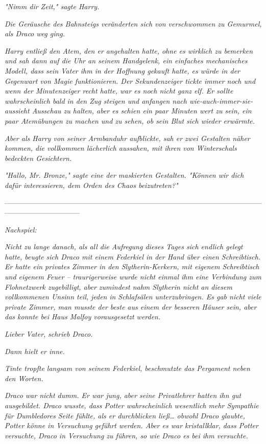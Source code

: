 {\emph{"Nimm dir Zeit," sagte Harry.}

\emph{Die Geräusche des Bahnsteigs veränderten sich von verschwommen zu Gemurmel, als Draco weg ging.}

\emph{Harry entließ den Atem, den er angehalten hatte, ohne es wirklich zu bemerken und sah dann auf die Uhr an seinem Handgelenk, ein einfaches mechanisches Modell, dass sein Vater ihm in der Hoffnung gekauft hatte, es würde in der Gegenwart von Magie funktionieren. Der Sekundenzeiger tickte immer noch und wenn der Minutenzeiger recht hatte, war es noch nicht ganz elf. Er sollte wahrscheinlich bald in den Zug steigen und anfangen nach wie-auch-immer-sie-aussieht Ausschau zu halten, aber es schien ein paar Minuten wert zu sein, ein paar Atemübungen zu machen und zu sehen, ob sein Blut sich wieder erwärmte.}

\emph{Aber als Harry von seiner Armbanduhr aufblickte, sah er zwei Gestalten näher kommen, die vollkommen lächerlich aussahen, mit ihren von Winterschals bedeckten Gesichtern.}

\emph{"Hallo, Mr. Bronze," sagte eine der maskierten Gestalten. "Können wir dich dafür interessieren, dem Orden des Chaos beizutreten?"}

--------------------------------------------------------------------------------------------------------------------------------------------

\emph{Nachspiel:}

\emph{Nicht zu lange danach, als all die Aufregung dieses Tages sich endlich gelegt hatte, beugte sich Draco mit einem Federkiel in der Hand über einen Schreibtisch. Er hatte ein privates Zimmer in den Slytherin-Kerkern, mit eigenem Schreibtisch und eigenem Feuer -- traurigerweise wurde nicht einmal ihm eine Verbindung zum Flohnetzwerk zugebilligt, aber zumindest nahm Slytherin nicht an diesem vollkommenen Unsinn teil,} \emph{\emph{jeden}} \emph{in Schlafsälen unterzubringen. Es gab nicht viele private Zimmer, man musste der} \emph{\emph{beste}} \emph{aus einem der besseren Häuser sein, aber das konnte bei Haus Malfoy vorausgesetzt werden.}

\emph{\emph{Lieber Vater,}} \emph{schrieb Draco.}

\emph{Dann hielt er inne.}

\emph{Tinte tropfte langsam von seinem Federkiel, beschmutzte das Pergament neben den Worten.}

\emph{Draco war nicht dumm. Er war jung, aber seine Privatlehrer hatten ihn gut ausgebildet. Draco wusste, dass Potter wahrscheinlich wesentlich mehr Sympathie für Dumbledores Seite fühlte, als er durchblicken ließ… obwohl Draco glaubte, Potter könne in Versuchung geführt werden. Aber es war kristallklar, dass Potter versuchte, Draco in Versuchung zu führen, so wie Draco es bei ihm versuchte.}

}
